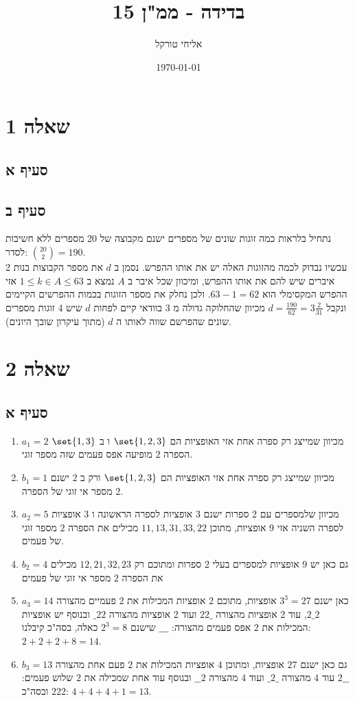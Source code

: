 \documentclass{article}
\title{בדידה - ממ"ן 15}
\author{אליחי טורקל \ID}
\date\today
\DeclarePairedDelimiter\set\{\}
\begin{document}
	\maketitle %

	\section*{שאלה 1}
	\subsection*{סעיף א}


	\subsection*{סעיף ב}
	נתחיל בלראות כמה זוגות שונים של מספרים ישנם מקבוצה של 20 מספרים ללא חשיבות לסדר: ${20 \choose 2} = 190$. \\
	עכשיו נבדוק לכמה מהזוגות האלה יש את אותו ההפרש. נסמן ב $d$ את מספר הקבוצות בנות 2 איברים שיש להם את אותו ההפרש, ומיכוון שכל איבר ב $A$ נמצא ב $1 \leq k \in A \leq 63$ אזי ההפרש המקסימלי הוא $63-1=62$.
	ולכן נחלק את מספר הזוגות בכמות ההפרשים הקיימים ונקבל $d = \frac{190}{62} = 3\frac{2}{31}$ מכיוון שהחלוקה גדולה מ 3 בוודאי קיים לפחות $d$ שיש 4 זוגות מספרים שונים שהפרשם שווה לאותו ה $d$ (מתוך עיקרון שובך היונים).


	\section*{שאלה 2}
	\subsection*{סעיף א}
	\begin{enumerate}
		\item $a_1 = 2$ מכיוון שמייצג רק ספרה אחת אזי האופציות הם $\set{1,2,3}$ ו ב $\set{1,3}$ הספרה $2$ מופיעה אפס פעמים שזה מספר זוגי.
		\item $b_1 = 1$ מכיוון שמייצג רק ספרה אחת אזי האופציות הם $\set{1,2,3}$ ורק ב $2$ ישנם מספר אי זוגי של הספרה $2$.
		\item $a_2 = 5$ מכיוון שלמספרים עם 2 ספרות ישנם 3 אופציות לספרה הראשונה ו 3 אופציות לספרה השניה אזי 9 אופציות, מתוכן $11, 13, 31, 33, 22$ מכילים את הספרה $2$ מספר זוגי של פעמים.
		\item $b_2 = 4$ גם כאן יש 9 אופציות למספרים בעלי 2 ספרות ומתוכם רק $12, 21, 32, 23$ מכילים את הספרה $2$ מספר אי זוגי של פעמים
		\item $a_3 = 14$ כאן ישנם $3^3 = 27$ אופציות, מתוכם 2 אופציות המכילות את $2$ פעמיים מהצורה $2\_2$, עוד 2 אופציות מהצורה $22\_$ ועוד 2 אופציות מהצורה $\_22$ ובנוסף יש אופציות המכילות את $2$ אפס פעמים מהצורה: $\_\_\_$ שישנם $2^3 = 8$ כאלה, בסה"כ קיבלנו: $2 + 2 + 2 + 8 = 14$.
		\item $b_3 = 13$ גם כאן ישנם $27$ אופציות, ומתוכן $4$ אופציות המכילות את $2$ פעם אחת מהצורה $2\_\_$ עוד $4$ מהצורה $\_2\_$ ועוד $4$ מהצורה $\_\_2$ ובנוסף עוד אחת שמכילה את $2$ שלוש פעמים: $222$ ובסה"כ: $4 + 4 + 4 + 1 = 13$.
	\end{enumerate}
\end{document}
